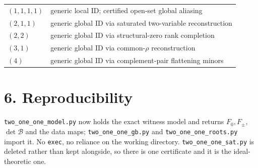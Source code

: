 \documentclass[11pt]{article}
\theoremstyle{remark}
\begin{document}
\begin{center}\small
\begin{tabular}{@{}ll@{}}
\toprule
$(1,1,1,1)$ & generic local ID; certified open-set global aliasing\\
$(2,1,1)$ & generic global ID via saturated two-variable reconstruction\\
$(2,2)$ & generic global ID via structural-zero rank completion\\
$(3,1)$ & generic global ID via common-$\rho$ reconstruction\\
$(4)$ & generic global ID via complement-pair flattening minors\\
\bottomrule
\end{tabular}
\end{center}

\section*{6. Reproducibility}

\texttt{two\_one\_one\_model.py} now holds the exact witness model and returns $F_0,F_\pm$, $\det\mathcal B$ and the data maps; \texttt{two\_one\_one\_gb.py} and \texttt{two\_one\_one\_roots.py} import it. No \texttt{exec}, no reliance on the working directory. \texttt{two\_one\_one\_sat.py} is deleted rather than kept alongside, so there is one certificate and it is the ideal-theoretic one.
\end{document}
